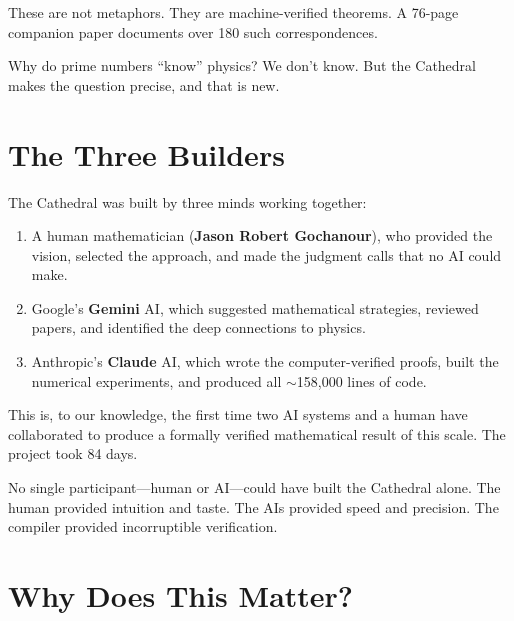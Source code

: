\documentclass[11pt,a4paper]{article}
\begin{document}
These are not metaphors. They are machine-verified theorems.
A 76-page companion paper documents over 180 such correspondences.

Why do prime numbers ``know'' physics? We don't know. But the
Cathedral makes the question precise, and that is new.

\section{The Three Builders}

The Cathedral was built by three minds working together:

\begin{enumerate}
  \item A human mathematician (\textbf{Jason Robert Gochanour}),
    who provided the vision, selected the approach, and made the
    judgment calls that no AI could make.
  \item Google's \textbf{Gemini} AI, which suggested mathematical
    strategies, reviewed papers, and identified the deep
    connections to physics.
  \item Anthropic's \textbf{Claude} AI, which wrote the
    computer-verified proofs, built the numerical experiments,
    and produced all $\sim$158{,}000 lines of code.
\end{enumerate}

This is, to our knowledge, the first time two AI systems and a
human have collaborated to produce a formally verified mathematical
result of this scale. The project took 84 days.

No single participant---human or AI---could have built the Cathedral
alone. The human provided intuition and taste. The AIs provided
speed and precision. The compiler provided incorruptible verification.

\section{Why Does This Matter?}
\end{document}
